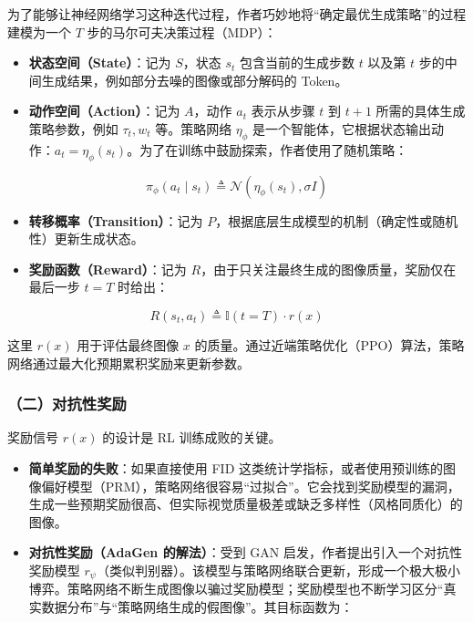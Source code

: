 为了能够让神经网络学习这种迭代过程，作者巧妙地将``确定最优生成策略''的过程建模为一个 \(T\) 步的马尔可夫决策过程（MDP）：

\begin{itemize}
\tightlist
\item
  \textbf{状态空间（State）}：记为 \(S\)，状态 \(s_t\) 包含当前的生成步数 \(t\) 以及第 \(t\) 步的中间生成结果，例如部分去噪的图像或部分解码的 Token。
\item
  \textbf{动作空间（Action）}：记为 \(A\)，动作 \(a_t\) 表示从步骤 \(t\) 到 \(t + 1\) 所需的具体生成策略参数，例如 \(\tau_t, w_t\) 等。策略网络 \(\eta_\phi\) 是一个智能体，它根据状态输出动作：\(a_t = \eta_\phi(s_t)\)。为了在训练中鼓励探索，作者使用了随机策略：
\end{itemize}

\[
\pi_\phi(a_t \mid s_t) \triangleq \mathcal{N}(\eta_\phi(s_t), \sigma I)
\]

\begin{itemize}
\tightlist
\item
  \textbf{转移概率（Transition）}：记为 \(P\)，根据底层生成模型的机制（确定性或随机性）更新生成状态。
\item
  \textbf{奖励函数（Reward）}：记为 \(R\)，由于只关注最终生成的图像质量，奖励仅在最后一步 \(t = T\) 时给出：
\end{itemize}

\[
R(s_t, a_t) \triangleq \mathbb{I}(t = T) \cdot r(x)
\]

这里 \(r(x)\) 用于评估最终图像 \(x\) 的质量。通过近端策略优化（PPO）算法，策略网络通过最大化预期累积奖励来更新参数。

\hypertarget{ux4e8cux5bf9ux6297ux6027ux5956ux52b1}{%
\subsubsection{（二）对抗性奖励}\label{ux4e8cux5bf9ux6297ux6027ux5956ux52b1}}

奖励信号 \(r(x)\) 的设计是 RL 训练成败的关键。

\begin{itemize}
\tightlist
\item
  \textbf{简单奖励的失败}：如果直接使用 FID 这类统计学指标，或者使用预训练的图像偏好模型（PRM），策略网络很容易``过拟合''。它会找到奖励模型的漏洞，生成一些预期奖励很高、但实际视觉质量极差或缺乏多样性（风格同质化）的图像。
\item
  \textbf{对抗性奖励（AdaGen 的解法）}：受到 GAN 启发，作者提出引入一个对抗性奖励模型 \(r_\psi\)（类似判别器）。该模型与策略网络联合更新，形成一个极大极小博弈。策略网络不断生成图像以骗过奖励模型；奖励模型也不断学习区分``真实数据分布''与``策略网络生成的假图像''。其目标函数为：
\end{itemize}

